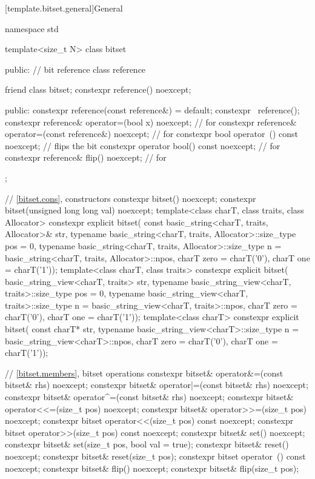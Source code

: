 [template.bitset.general]{General}%
%
\begin{codeblock}
namespace std {
  template<size_t N> class bitset {
  public:
    // bit reference
    class reference {
      friend class bitset;
      constexpr reference() noexcept;

    public:
      constexpr reference(const reference&) = default;
      constexpr ~reference();
      constexpr reference& operator=(bool x) noexcept;              // for 
      constexpr reference& operator=(const reference&) noexcept;    // for 
      constexpr bool operator~() const noexcept;                    // flips the bit
      constexpr operator bool() const noexcept;                     // for 
      constexpr reference& flip() noexcept;                         // for 
    };

    // \ref{bitset.cons}, constructors
    constexpr bitset() noexcept;
    constexpr bitset(unsigned long long val) noexcept;
    template<class charT, class traits, class Allocator>
      constexpr explicit bitset(
        const basic_string<charT, traits, Allocator>& str,
        typename basic_string<charT, traits, Allocator>::size_type pos = 0,
        typename basic_string<charT, traits, Allocator>::size_type n
          = basic_string<charT, traits, Allocator>::npos,
        charT zero = charT('0'),
        charT one = charT('1'));
    template<class charT, class traits>
      constexpr explicit bitset(
        basic_string_view<charT, traits> str,
        typename basic_string_view<charT, traits>::size_type pos = 0,
        typename basic_string_view<charT, traits>::size_type n
          = basic_string_view<charT, traits>::npos,
        charT zero = charT('0'),
        charT one = charT('1'));
    template<class charT>
      constexpr explicit bitset(
        const charT* str,
        typename basic_string_view<charT>::size_type n = basic_string_view<charT>::npos,
        charT zero = charT('0'),
        charT one = charT('1'));

    // \ref{bitset.members}, bitset operations
    constexpr bitset& operator&=(const bitset& rhs) noexcept;
    constexpr bitset& operator|=(const bitset& rhs) noexcept;
    constexpr bitset& operator^=(const bitset& rhs) noexcept;
    constexpr bitset& operator<<=(size_t pos) noexcept;
    constexpr bitset& operator>>=(size_t pos) noexcept;
    constexpr bitset  operator<<(size_t pos) const noexcept;
    constexpr bitset  operator>>(size_t pos) const noexcept;
    constexpr bitset& set() noexcept;
    constexpr bitset& set(size_t pos, bool val = true);
    constexpr bitset& reset() noexcept;
    constexpr bitset& reset(size_t pos);
    constexpr bitset  operator~() const noexcept;
    constexpr bitset& flip() noexcept;
    constexpr bitset& flip(size_t pos);

}}
\end{codeblock}
